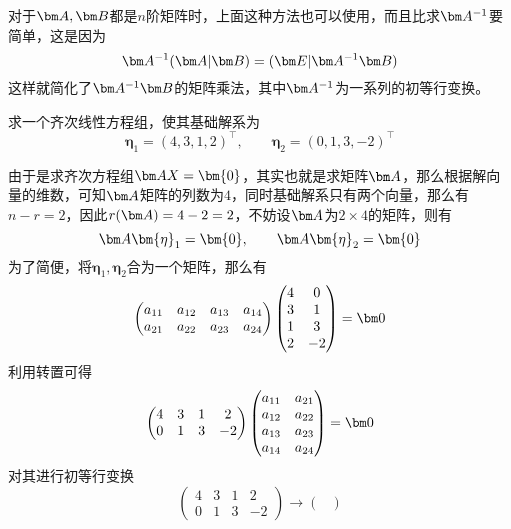 对于$\mat{A},\mat{B}$都是$n$阶矩阵时，上面这种方法也可以使用，而且比求$\mat{A}^{-1}$要简单，这是因为
\[ \mat{A}^{-1}(\mat{A}|\mat{B}) = (\mat{E}|\mat{A}^{-1}\mat{B}) \]
这样就简化了$\mat{A}^{-1}\mat{B}$的矩阵乘法，其中$\mat{A}^{-1}$为一系列的初等行变换。

\begin{example}
    求一个齐次线性方程组，使其基础解系为
    \[ \bm{\eta}_1 = (4,3,1,2)^\intercal,\qquad \bm{\eta}_2 = (0,1,3,-2)^\intercal \]
\end{example}
\begin{solution}
    由于是求齐次方程组$\mat{AX}=\bm{0}$，其实也就是求矩阵$\mat{A}$，那么根据解向量的维数，可知$\mat{A}$矩阵的列数为$4$，同时基础解系只有两个向量，那么有
    $n-r=2$，因此$r(\mat{A}) = 4-2 = 2$，不妨设$\mat{A}$为$2\times 4$的矩阵，则有
    \[ \mat{A}\bm{\eta}_1 = \bm{0}, \qquad \mat{A}\bm{\eta}_2 = \bm{0} \]
    为了简便，将$\bm{\eta}_1,\bm{\eta}_2$合为一个矩阵，那么有
    \[
        \begin{pmatrix}
            a_{11} & a_{12} & a_{13} & a_{14} \\
            a_{21} & a_{22} & a_{23} & a_{24} \\
        \end{pmatrix}
        \begin{pmatrix}
            4 & 0  \\
            3 & 1  \\
            1 & 3  \\
            2 & -2
        \end{pmatrix}
        =\mat{0}
    \]
    利用转置可得
    \[
        \begin{pmatrix}
            4 & 3 & 1 & 2  \\
            0 & 1 & 3 & -2
        \end{pmatrix}
        \begin{pmatrix}
            a_{11} & a_{21} \\
            a_{12} & a_{22} \\
            a_{13} & a_{23} \\
            a_{14} & a_{24} \\
        \end{pmatrix}
        =\mat{0}
    \]
    对其进行初等行变换
    \[
        \begin{pmatrix}
            4 & 3 & 1 & 2  \\
            0 & 1 & 3 & -2
        \end{pmatrix}
        \longrightarrow
        \begin{pmatrix}

\end{pmatrix}\]
\end{solution}
